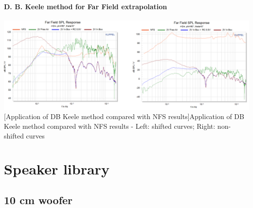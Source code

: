 \documentclass{report}
\begin{document}
\begin{appendices}
\subsubsection{D. B. Keele method for Far Field extrapolation}
\label{Curves:dbkFF}

\begin{center}
	\includegraphics[width=\textwidth]{Appendix/DKeele_FF_All} 
    \captionsetup{hypcap=false} 
	[Application of DB Keele method compared with NFS results]{Application of DB Keele method compared with NFS results - Left: shifted curves; Right: non-shifted curves} 
	\label{fig:dbk_fig}
\end{center}

\chapter{Speaker library}
\label{chap:spk_lib}

\section{10 cm woofer}
\label{spkrlib:10cm}


\end{appendices}
\end{document}

